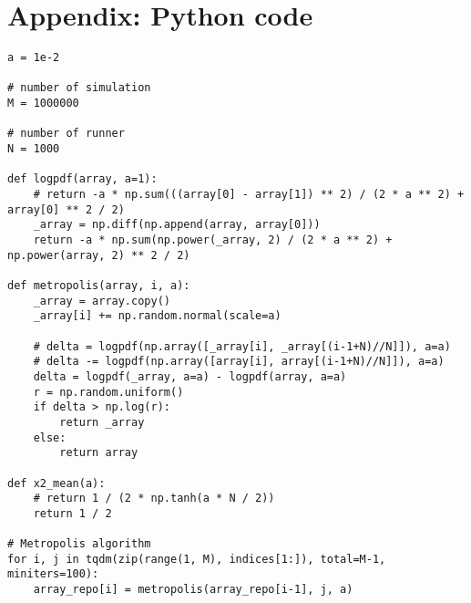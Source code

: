 \section*{Appendix: Python code}
\begin{lstlisting}
a = 1e-2

# number of simulation
M = 1000000

# number of runner
N = 1000

def logpdf(array, a=1):
    # return -a * np.sum(((array[0] - array[1]) ** 2) / (2 * a ** 2) + array[0] ** 2 / 2)
    _array = np.diff(np.append(array, array[0]))
    return -a * np.sum(np.power(_array, 2) / (2 * a ** 2) + np.power(array, 2) ** 2 / 2)

def metropolis(array, i, a):
    _array = array.copy()
    _array[i] += np.random.normal(scale=a)

    # delta = logpdf(np.array([_array[i], _array[(i-1+N)//N]]), a=a)
    # delta -= logpdf(np.array([array[i], array[(i-1+N)//N]]), a=a)
    delta = logpdf(_array, a=a) - logpdf(array, a=a)
    r = np.random.uniform()
    if delta > np.log(r):
        return _array
    else:
        return array

def x2_mean(a):
    # return 1 / (2 * np.tanh(a * N / 2))
    return 1 / 2

# Metropolis algorithm
for i, j in tqdm(zip(range(1, M), indices[1:]), total=M-1, miniters=100):
    array_repo[i] = metropolis(array_repo[i-1], j, a)

\end{lstlisting}

